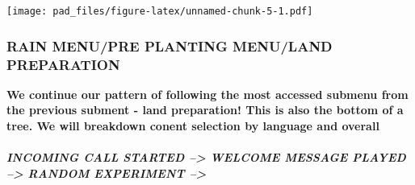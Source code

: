 \documentclass[
]{article}
\newenvironment{Shaded}{\begin{snugshade}}{\end{snugshade}}
\newcommand{\AttributeTok}[1]{\textcolor[rgb]{0.77,0.63,0.00}{#1}}
\newcommand{\CommentTok}[1]{\textcolor[rgb]{0.56,0.35,0.01}{\textit{#1}}}
\newcommand{\DecValTok}[1]{\textcolor[rgb]{0.00,0.00,0.81}{#1}}
\newcommand{\FunctionTok}[1]{\textcolor[rgb]{0.00,0.00,0.00}{#1}}
\newcommand{\NormalTok}[1]{#1}
\newcommand{\OtherTok}[1]{\textcolor[rgb]{0.56,0.35,0.01}{#1}}
\newcommand{\SpecialCharTok}[1]{\textcolor[rgb]{0.00,0.00,0.00}{#1}}
\newcommand{\StringTok}[1]{\textcolor[rgb]{0.31,0.60,0.02}{#1}}
\begin{document}
\begin{Shaded}
\end{Shaded}

\texttt{[image: pad\_files/figure-latex/unnamed-chunk-5-1.pdf]}

\hypertarget{rain-menupre-planting-menuland-preparation}{%
\subsubsection{RAIN MENU/PRE PLANTING MENU/LAND
PREPARATION}\label{rain-menupre-planting-menuland-preparation}}

\textbf{We continue our pattern of following the most accessed submenu
from the previous subment - land preparation! This is also the bottom of
a tree. We will breakdown conent selection by language and overall}

\hypertarget{incoming-call-started-welcome-message-played-random-experiment-1}{%
\subparagraph{INCOMING CALL STARTED --\textgreater{} WELCOME MESSAGE
PLAYED --\textgreater{} RANDOM EXPERIMENT
--\textgreater{}}\label{incoming-call-started-welcome-message-played-random-experiment-1}}
\end{document}
